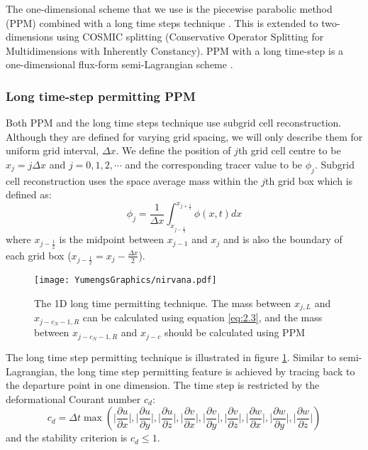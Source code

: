 The one-dimensional scheme that we use is the piecewise parabolic method (PPM) \citep{Colella1984} combined with a long time steps technique \citep{Leonard1995}. This is extended to two-dimensions using COSMIC splitting \citep{Leonard1996} (Conservative Operator Splitting for Multidimensions with Inherently Constancy). PPM with a long time-step is a one-dimensional flux-form semi-Lagrangian scheme \citep{Lin1996}.

\subsubsection{Long time-step permitting PPM} 
\label{sec:PPM}

Both PPM and the long time steps technique use subgrid cell reconstruction. Although they are defined for varying grid spacing, we will only describe them for uniform grid interval, $\Delta x$. We define the position of $j$th grid cell centre to be $x_j = j\Delta x$ and $j = 0, 1, 2, \cdots$ and the corresponding tracer value to be $\phi_j$. Subgrid cell reconstruction uses the space average mass within the $j$th grid box which is defined as: 
\begin{equation} \label{eq:2.1} 
\phi_j = \frac{1}{\Delta x} \int^{x_{j+\frac{1}{2}}}_{x_{j-\frac{1}{2}}} \phi (x,t)dx
\end{equation}
where $x_{j-\frac{1}{2}}$ is the midpoint between $x_{j-1}$ and $x_{j}$ and is also the boundary of each grid box ($x_{j-\frac{1}{2}} = x_j - \frac{\Delta x}{2}$).
\begin{figure}
\centering
\texttt{[image: YumengsGraphics/nirvana.pdf]}
\caption{The 1D long time permitting technique. The mass between $x_{j,L}$ and $x_{j-c_N-1,R}$ can be calculated using equation \ref{eq:2.3}, and the mass between $x_{j-c_N-1,R}$ and $x_{j-c}$ should be calculated using PPM \label{fig:2.1}}
\end{figure}

The long time step permitting technique is illustrated in figure \ref{fig:2.1}. Similar to semi-Lagrangian, the long time step permitting feature is achieved by tracing back to the departure point in one dimension. The time step is restricted by the deformational Courant number $c_d$:
\begin{equation}
c_d=
\Delta t \max
\left(\biggl|\frac{\partial u}{\partial x}\biggr|,\biggl|\frac{\partial u}{\partial y}\biggr|,\biggl|\frac{\partial u}{\partial z}\biggr|,\biggl|\frac{\partial v}{\partial x}\biggr|,\biggl|\frac{\partial v}{\partial y}\biggr|,\biggl|\frac{\partial v}{\partial z}\biggr|,\biggl|\frac{\partial w}{\partial x}\biggr|,\biggl|\frac{\partial w}{\partial y}\biggr|,\biggl|\frac{\partial w}{\partial z}\biggr|\right)
\label{eq:cd}
\end{equation}
\citep{PS84} and the stability criterion is $c_d \leq 1$.

